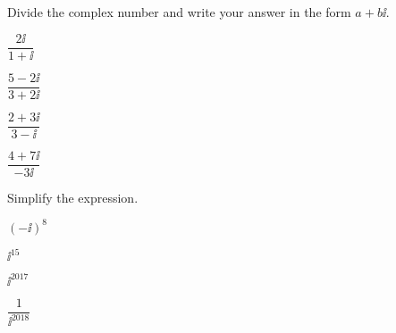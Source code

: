 \begin{exercise}
	Divide the complex number and write your answer in the form $a+b\ii$.
	\\
	\begin{enumerate*}[label={(\arabic*)~}]
		\item $\dfrac{2\ii}{1+\ii}$
		\item $\dfrac{5-2\ii}{3+2\ii}$
		\item $\dfrac{2+3\ii}{3-\ii}$
		\item $\dfrac{4+7\ii}{-3\ii}$ 
		\hfill\null
	\end{enumerate*}
\end{exercise}

\begin{center} \hfill
\end{center}


\newpage

\begin{exercise}
	Simplify the expression. %
	\\
	\begin{enumerate*}[label={(\arabic*)~}]
		\item $(-\ii)^{8}$
		\item $\ii^{15}$
		\item $\ii^{2017}$
		\item $\dfrac1{\ii^{2018}}$
		\hfill\null
	\end{enumerate*}
\end{exercise}
\vfill
\begin{center} \hfill
\end{center}


